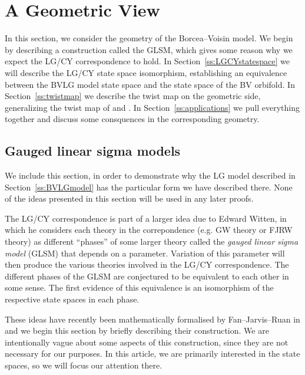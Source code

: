 \documentclass[10pt, letterpaper]{amsart}
\theoremstyle{remark}
\begin{document}


\section{A Geometric View}\label{s:geometry}

In this section, we consider the geometry of the Borcea--Voisin model. We begin by describing a construction called the GLSM, which gives some reason why we expect the LG/CY correspondence to hold. %
In Section~\ref{ss:LGCYstatespace} we will describe the LG/CY state space isomorphism, establishing an equivalence between the BVLG model state space and the state space of the BV orbifold. In Section~\ref{ss:twistmap} we describe the twist map on the geometric side, generalizing the twist map of \cite{Borcea} and \cite{ABS}. In Section~\ref{ss:applications} we pull everything together and discuss some consquences in the corresponding geometry. 



\subsection{Gauged linear sigma models}\label{ss:GLSM}
We include this section, in order to demonstrate why the LG model described in Section~\ref{ss:BVLGmodel} has the particular form we have described there. None of the ideas presented in this section will be used in any later proofs. 

The LG/CY correspondence is part of a larger idea due to Edward Witten, in which he considers each theory in the correpondence (e.g. GW theory or FJRW theory) as different ``phases'' of some larger theory called the \emph{gauged linear sigma model} (GLSM) that depends on a parameter. Variation of this parameter will then produce the various theories involved in the LG/CY correspondence. The different phases of the GLSM are conjectured to be equivalent to each other in some sense. The first evidence of this equivalence is an isomorphism of the respective state spaces in each phase. 

These ideas have recently been mathematically formalised by Fan--Jarvis--Ruan in \cite{FJR15} and we begin this section by briefly describing their construction. We are intentionally vague about some aspects of this construction, since they are not necessary for our purposes. In this article, we are primarily interested in the state spaces, so we will focus our attention there. 
\end{document}
